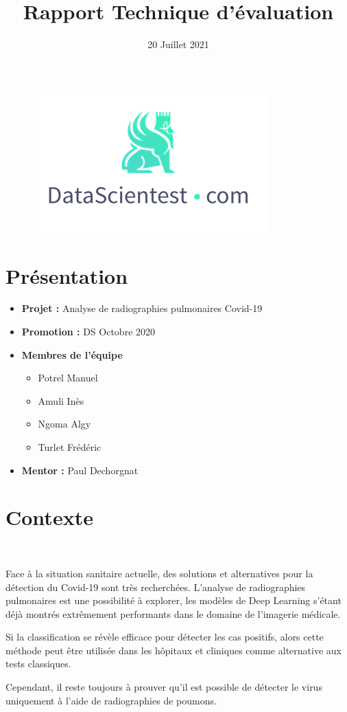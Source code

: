 \documentclass{article}
\title{Rapport Technique d'évaluation}
\date{20 Juillet 2021}
\begin{document}
\maketitle

\begin{figure}[!t] 
    \center 
    \includegraphics{banniere.png} 
\end{figure}

	\section*{Présentation}

	\begin{itemize}	
	
		\item \textbf{Projet :} Analyse de radiographies pulmonaires Covid-19
	
		\item \textbf{Promotion :} DS Octobre 2020
				
		\item \textbf{Membres de l'équipe}
			
		\begin{itemize}
			\item Potrel Manuel
			\item Amuli Inès
			\item Ngoma Algy
			\item Turlet Frédéric
		\end{itemize}
		
		\item \textbf{Mentor :} Paul Dechorgnat
		
	\end{itemize}
	
	\newpage	
	\section*{Contexte}
	
	~ 
	\par Face à la situation sanitaire actuelle, des solutions et alternatives pour la détection du Covid-19 sont très recherchées. L'analyse de radiographies pulmonaires est une possibilité à explorer, les modèles de Deep Learning s'étant déjà montrés extrêmement performants dans le domaine de l'imagerie médicale.
	\par Si la classification se révèle efficace pour détecter les cas positifs, alors cette méthode peut être utilisée dans les hôpitaux et cliniques comme alternative aux tests classiques.
	\par Cependant, il reste toujours à prouver qu'il est possible de détecter le virus uniquement à l'aide de radiographies de poumons.
	
\end{document}
